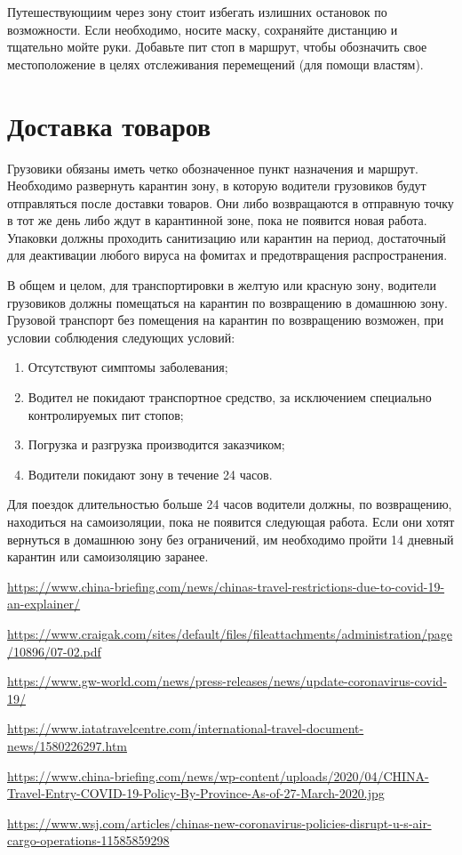 \documentclass[onecolumn,journal]{IEEEtran}
\begin{document}
\begin{multicols}{2}
Путешествующиим через зону стоит избегать излишних остановок по возможности. Если необходимо, носите маску, сохраняйте дистанцию и тщательно мойте руки. Добавьте пит стоп в маршрут, чтобы обозначить свое местоположение в целях отслеживания перемещений (для помощи властям).

\section{Доставка товаров}

Грузовики обязаны иметь четко обозначенное пункт назначения и маршрут. Необходимо развернуть карантин зону, в которую водители грузовиков будут отправляться после доставки товаров. Они либо возвращаются в отправную точку в тот же день либо ждут в карантинной зоне, пока не появится новая работа.
Упаковки должны проходить санитизацию или карантин на период, достаточный для деактивации любого вируса на фомитах и предотвращения распространения.

В общем и целом, для транспортировки в желтую или красную зону, водители грузовиков должны помещаться на карантин по возвращению в домашнюю зону. Грузовой транспорт без помещения на карантин по возвращению возможен, при условии соблюдения следующих условий:
\begin{enumerate}
\item Отсутствуют симптомы заболевания;
\item Водител не покидают транспортное средство, за исключением специально контролируемых пит стопов;
\item Погрузка и разгрузка производится заказчиком;
\item Водители покидают зону в течение 24 часов.
\end{enumerate}
Для поездок длительностью больше 24 часов водители должны, по возвращению, находиться на самоизоляции, пока не появится следующая работа. Если они хотят вернуться в домашнюю зону без ограничений, им необходимо пройти 14 дневный карантин или самоизоляцию заранее.

\end{multicols}
\begin{thebibliography}{20}

 \url{https://www.china-briefing.com/news/chinas-travel-restrictions-due-to-covid-19-an-explainer/}

 \url{https://www.craigak.com/sites/default/files/fileattachments/administration/page/10896/07-02.pdf}

 \url{https://www.gw-world.com/news/press-releases/news/update-coronavirus-covid-19/}

 \url{https://www.iatatravelcentre.com/international-travel-document-news/1580226297.htm}

 \url{https://www.china-briefing.com/news/wp-content/uploads/2020/04/CHINA-Travel-Entry-COVID-19-Policy-By-Province-As-of-27-March-2020.jpg}

 \url{https://www.wsj.com/articles/chinas-new-coronavirus-policies-disrupt-u-s-air-cargo-operations-11585859298}


\end{thebibliography}

% 
\end{document}
